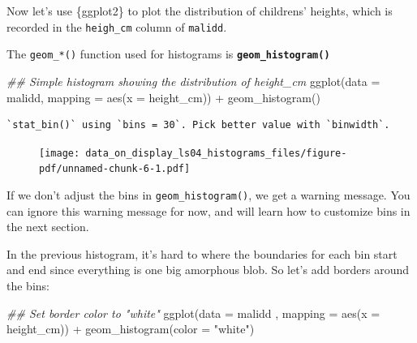 \documentclass[
  letterpaper,
  DIV=11,
  numbers=noendperiod]{scrreprt}
\newenvironment{Shaded}{\begin{snugshade}}{\end{snugshade}}
\newcommand{\AttributeTok}[1]{\textcolor[rgb]{0.40,0.45,0.13}{#1}}
\newcommand{\DocumentationTok}[1]{\textcolor[rgb]{0.37,0.37,0.37}{\textit{#1}}}
\newcommand{\FunctionTok}[1]{\textcolor[rgb]{0.28,0.35,0.67}{#1}}
\newcommand{\NormalTok}[1]{\textcolor[rgb]{0.00,0.23,0.31}{#1}}
\newcommand{\SpecialCharTok}[1]{\textcolor[rgb]{0.37,0.37,0.37}{#1}}
\newcommand{\StringTok}[1]{\textcolor[rgb]{0.13,0.47,0.30}{#1}}
\begin{document}
Now let's use \{ggplot2\} to plot the distribution of childrens'
heights, which is recorded in the \texttt{heigh\_cm} column of
\texttt{malidd}.

The \texttt{geom\_*()} function used for histograms is
\textbf{\texttt{geom\_histogram()}}

\begin{Shaded}
\begin{Highlighting}[]
\DocumentationTok{\#\# Simple histogram showing the distribution of height\_cm}
\FunctionTok{ggplot}\NormalTok{(}\AttributeTok{data =}\NormalTok{ malidd, }
       \AttributeTok{mapping =} \FunctionTok{aes}\NormalTok{(}\AttributeTok{x =}\NormalTok{ height\_cm)) }\SpecialCharTok{+}
  \FunctionTok{geom\_histogram}\NormalTok{()}
\end{Highlighting}
\end{Shaded}

\begin{verbatim}
`stat_bin()` using `bins = 30`. Pick better value with `binwidth`.
\end{verbatim}

\begin{figure}[H]

{\centering \texttt{[image: data\_on\_display\_ls04\_histograms\_files/figure-pdf/unnamed-chunk-6-1.pdf]}

}

\end{figure}

\begin{tcolorbox}[enhanced jigsaw, colframe=quarto-callout-note-color-frame, colbacktitle=quarto-callout-note-color!10!white, titlerule=0mm, opacitybacktitle=0.6, breakable, toprule=.15mm, arc=.35mm, rightrule=.15mm, colback=white, bottomrule=.15mm, opacityback=0, toptitle=1mm, left=2mm, bottomtitle=1mm, title=\textcolor{quarto-callout-note-color}{\faInfo}\hspace{0.5em}{Side Note}, leftrule=.75mm, coltitle=black]

If we don't adjust the bins in \texttt{geom\_histogram()}, we get a
warning message. You can ignore this warning message for now, and will
learn how to customize bins in the next section.

\end{tcolorbox}

In the previous histogram, it's hard to where the boundaries for each
bin start and end since everything is one big amorphous blob. So let's
add borders around the bins:

\begin{Shaded}
\begin{Highlighting}[]
\DocumentationTok{\#\# Set border color to "white"}
\FunctionTok{ggplot}\NormalTok{(}\AttributeTok{data =}\NormalTok{  malidd , }
       \AttributeTok{mapping =} \FunctionTok{aes}\NormalTok{(}\AttributeTok{x =}\NormalTok{ height\_cm)) }\SpecialCharTok{+}
  \FunctionTok{geom\_histogram}\NormalTok{(}\AttributeTok{color =} \StringTok{"white"}\NormalTok{)}
\end{Highlighting}
\end{Shaded}
\end{document}
